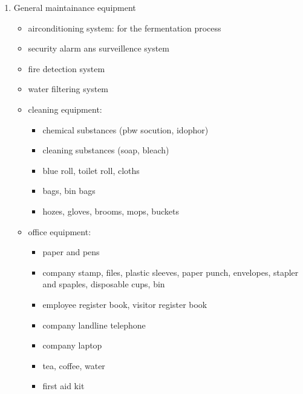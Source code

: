 \documentclass{article}
\begin{document}
\begin{enumerate}
    \item General maintainance equipment
      \begin{itemize}
      \item airconditioning system: for the fermentation process
      \item security alarm ans surveillence system
      \item fire detection system
      \item water filtering system
      \item cleaning equipment: \\
        \begin{itemize}
        \item chemical substances (pbw socution, idophor)
        \item cleaning substances (soap, bleach)
        \item blue roll, toilet roll, cloths
        \item bags, bin bags
        \item hozes, gloves, brooms, mops, buckets
        \end{itemize}
      \item office equipment:
        \begin{itemize}
        \item paper and pens
        \item company stamp, files, plastic sleeves, paper punch, envelopes, stapler and spaples, disposable cups, bin
        \item employee register book, visitor register book
        \item company landline telephone
        \item company laptop
        \item tea, coffee, water
        \item first aid kit
        \end{itemize}
      \end{itemize}

    \end{enumerate}
\end{document}
